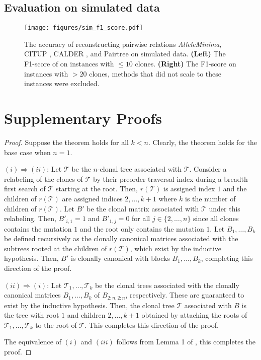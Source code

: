 \documentclass[10pt]{article}
\newcommand{\ourmethod}{\textit{AlleleMinima}\xspace}
\newcommand{\tree}{\mathcal{T}}
\begin{document}
\subsection{Evaluation on simulated data}
\begin{figure}
    \centering
    \texttt{[image: figures/sim\_f1\_score.pdf]}
    \caption{
        \label{fig:sim_f1_score}
        The accuracy of reconstructing pairwise relations \ourmethod, CITUP \cite{malikic_clonality_2015}, 
        CALDER \cite{myers_calder_2019}, and Pairtree \cite{wintersinger_reconstructing_2022} on simulated data. 
        \textbf{(Left)} The F1-score of on 
        instances with $\leq 10$ clones. \textbf{(Right)} The F1-score on instances with 
        $> 20$ clones, methods that did not scale to these instances were excluded.
    }
\end{figure}

\newpage



\newpage
\appendix
\section{Supplementary Proofs}
\label{sec:supplementary_proofs}
\clonallycanonical*
\begin{proof}
    Suppose the theorem holds for all $k < n$. Clearly, the theorem holds for the base case when $n = 1$.

    $(i) \Rightarrow (ii)$: Let $\tree$ be the $n$-clonal tree associated with $\tree$. Consider a 
    relabeling of the clones of $\tree$ by their preorder traversal index during a breadth first search
    of $\tree$ starting at the root. Then, $r(\tree)$ is assigned index $1$ and the children of $r(\tree)$ 
    are assigned indices $2, \ldots, k + 1$ where $k$ is the number of children of $r(\tree)$. Let $B'$
    be the clonal matrix associated with $\tree$ under this relabeling. Then, $B'_{i,1} = 1$
    and $B'_{1, j} = 0$ for all $j \in \{2, \ldots, n\}$ since all clones contains the mutation $1$ 
    and the root only contains the mutation $1$. Let $B_1, \ldots, B_k$ be defined recursively
    as the clonally canonical matrices associated with the subtrees rooted at the children of $r(\tree)$,
    which exist by the inductive hypothesis. Then, $B'$ is clonally canonical with blocks $B_1, \ldots, B_k$,
    completing this direction of the proof.

    $(ii) \Rightarrow (i)$: Let $\tree_1, \ldots, \tree_k$ be the clonal trees associated with the
    clonally canonical matrices $B_1, \ldots, B_k$ of $B_{2:n, 2:n}$, respectively. These 
    are guaranteed to exist by the inductive hypothesis. Then, the clonal 
    tree $\tree$ associated with $B$ is the tree with root $1$ and children $2, \ldots, k + 1$ obtained
    by attaching the roots of $\tree_1, \ldots, \tree_k$ to the root of $\tree$. This completes
    this direction of the proof.

    The equivalence of $(i)$ and $(iii)$ follows from Lemma 1 of \cite{el-kebir_reconstruction_2015},
    this completes the proof.
\end{proof}
\end{document}
